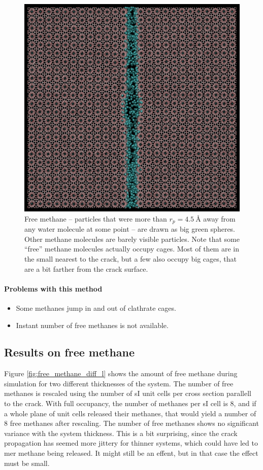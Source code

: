 \begin{figure}
\centering
\includegraphics[width=\textwidth]{../pictures/free_methane.pdf}
\caption{Free methane -- particles that were more than $r_p = \SI{4.5}{\angstrom}$ away from any water molecule at some point -- are drawn as big green spheres. Other methane molecules are barely visible particles. Note that some ``free'' methane molecules actually occupy cages. Most of them are in the small nearest to the crack, but a few also occupy big cages, that are a bit farther from the crack surface. }
\label{fig:free_methane}
\end{figure}


\paragraph{Problems with this method}
\begin{itemize}
\item Some methanes jump in and out of clathrate cages. 
\item Instant number of free methanes is not available.
\end{itemize}

\subsection{Results on free methane}
Figure \ref{fig:free_methane_diff_l} shows the amount of free methane during simulation for two different thicknesses of the system. The number of free methanes is rescaled using the number of sI unit cells per cross section parallell to the crack. With full occupancy, the number of methanes per sI cell is 8, and if a whole plane of unit cells released their methanes, that would yield a number of 8 free methanes after rescaling. The number of free methanes shows no significant variance with the system thickness. This is a bit surprising, since the crack propagation has seemed more jittery for thinner systems, which could have led to mer methane being released. It might still be an effent, but in that case the effect must be small. 

